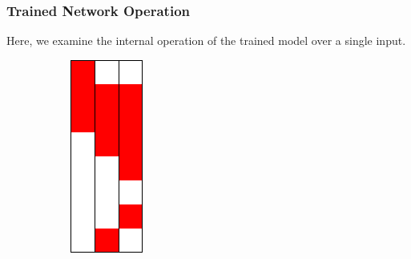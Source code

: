 \subsubsection{Trained Network Operation}
Here, we examine the internal operation of the trained model over a single 
input.
\begin{figure}[h]
	\centering
	\begin{subfigure}{.15\textwidth}
		\centering
		\includegraphics[width=.75\textwidth]{fullRun/0_py/input.png}

\end{subfigure}
\end{figure}
